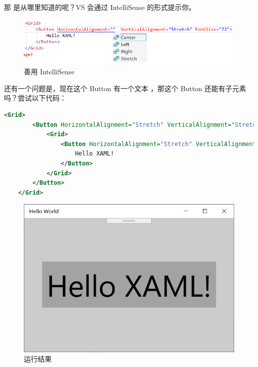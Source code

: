 那  是从哪里知道的呢？VS 会通过 IntelliSense 的形式提示你。
\begin{figure}[htbp]
    \centering
    \includegraphics[width = 0.75\paperwidth]{pic/16.png}
    \caption{善用 IntelliSense}
\end{figure}

还有一个问题是，现在这个 Button 有一个文本 ，那这个 Button 还能有子元素吗？尝试以下代码：
\begin{lstlisting}[language = xml]
    <Grid>
        <Button HorizontalAlignment="Stretch" VerticalAlignment="Stretch" FontSize="72">
            <Grid>
                <Button HorizontalAlignment="Stretch" VerticalAlignment="Stretch" FontSize="72">
                    Hello XAML!
                </Button>
            </Grid>
        </Button>
    </Grid>
\end{lstlisting}
\begin{figure}[htbp]
    \centering
    \includegraphics[width = 0.5\paperwidth]{pic/17.png}
    \caption{运行结果}
\end{figure}

